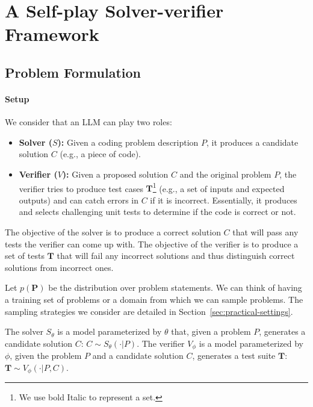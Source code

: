 \section{A Self-play Solver-verifier Framework}
\subsection{Problem Formulation}
\label{sec:problem-formulation}
\paragraph{Setup} We consider that an LLM can play two roles:
\vspace{-2mm}
\begin{itemize}[leftmargin=*]
    \item \textbf{Solver ($S$):} Given a coding problem description $P$, it produces a candidate solution $C$ (e.g., a piece of code).
    \item \textbf{Verifier ($V$):} Given a proposed solution $C$ and the original problem $P$, the verifier tries to produce test cases $\mathbf{T}$\footnote{We use bold Italic to represent a set.} (e.g., a set of inputs and expected outputs) and can catch errors in $C$ if it is incorrect. Essentially, it produces and selects challenging unit tests to determine if the code is correct or not.%
\end{itemize}

The objective of the solver is to produce a correct solution $C$ that will pass any tests the verifier can come up with. The objective of the verifier is to produce a set of tests $\mathbf{T}$ that will fail any incorrect solutions and thus distinguish correct solutions from incorrect ones.

Let $p(\mathbf{P})$ be the distribution over problem statements. We can think of having a training set of problems or a domain from which we can sample problems. The sampling strategies we consider are detailed  in Section~\ref{sec:practical-settings}.

The solver $S_{\theta}$ is a model parameterized by $\theta$ that, given a problem $P$, generates a candidate solution $C$: $C \sim S_{\theta}(\cdot | P)$. The verifier $V_{\phi}$ is a model parameterized by $\phi$, given the problem $P$ and a candidate solution $C$, generates a test suite $\mathbf{T}$: $\mathbf{T} \sim V_{\phi}(\cdot | P, C)$.

